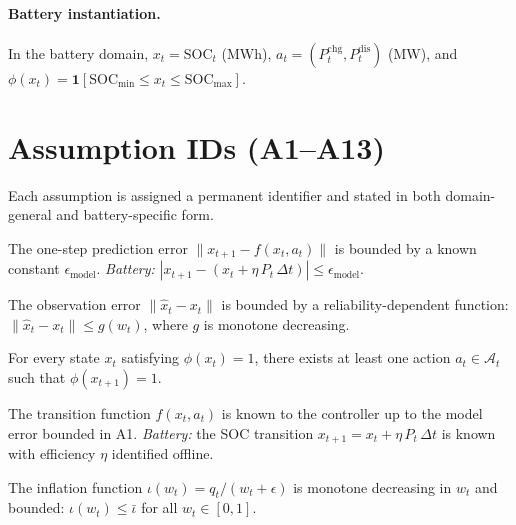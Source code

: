 \paragraph{Battery instantiation.}
In the battery domain, $x_t = \text{SOC}_t$ (MWh),
$a_t = (P_t^{\text{chg}}, P_t^{\text{dis}})$ (MW), and
$\phi(x_t) = \mathbf{1}[\text{SOC}_{\min} \le x_t \le \text{SOC}_{\max}]$.

\section{Assumption IDs (A1--A13)}

Each assumption is assigned a permanent identifier and stated in both
domain-general and battery-specific form.

\begin{assumption}
\label{assm:A1}
The one-step prediction error $\|x_{t+1} - f(x_t, a_t)\|$ is bounded
by a known constant $\epsilon_{\text{model}}$.
\emph{Battery:} $|x_{t+1} - (x_t + \eta\,P_t\,\Delta t)| \le \epsilon_{\text{model}}$.
\end{assumption}

\begin{assumption}
\label{assm:A2}
The observation error $\|\hat{x}_t - x_t\|$ is bounded by a
reliability-dependent function: $\|\hat{x}_t - x_t\| \le g(w_t)$,
where $g$ is monotone decreasing.
\end{assumption}

\begin{assumption}
\label{assm:A3}
For every state $x_t$ satisfying $\phi(x_t) = 1$, there exists at
least one action $a_t \in \mathcal{A}_t$ such that $\phi(x_{t+1}) = 1$.
\end{assumption}

\begin{assumption}
\label{assm:A4}
The transition function $f(x_t, a_t)$ is known to the controller up
to the model error bounded in A1.
\emph{Battery:} the SOC transition $x_{t+1} = x_t + \eta\,P_t\,\Delta t$
is known with efficiency $\eta$ identified offline.
\end{assumption}

\begin{assumption}
\label{assm:A5}
The inflation function $\iota(w_t) = q_t / (w_t + \epsilon)$ is
monotone decreasing in $w_t$ and bounded: $\iota(w_t) \le \bar{\iota}$
for all $w_t \in [0,1]$.
\end{assumption}

